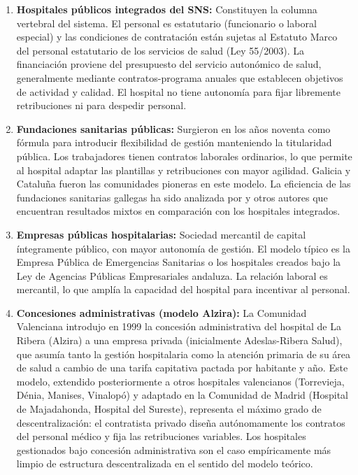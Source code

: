 \documentclass[12pt, a4paper, twoside, openright]{book}
\theoremstyle{plain}
\theoremstyle{definition}
\theoremstyle{remark}
\begin{document}
\begin{enumerate}[label=(\roman*)]
  \item \textbf{Hospitales públicos integrados del SNS:} Constituyen la columna vertebral del sistema. El personal es estatutario (funcionario o laboral especial) y las condiciones de contratación están sujetas al Estatuto Marco del personal estatutario de los servicios de salud (Ley 55/2003). La financiación proviene del presupuesto del servicio autonómico de salud, generalmente mediante contratos-programa anuales que establecen objetivos de actividad y calidad. El hospital no tiene autonomía para fijar libremente retribuciones ni para despedir personal.

  \item \textbf{Fundaciones sanitarias públicas:} Surgieron en los años noventa como fórmula para introducir flexibilidad de gestión manteniendo la titularidad pública. Los trabajadores tienen contratos laborales ordinarios, lo que permite al hospital adaptar las plantillas y retribuciones con mayor agilidad. Galicia y Cataluña fueron las comunidades pioneras en este modelo. La eficiencia de las fundaciones sanitarias gallegas ha sido analizada por \citet{prior2006} y otros autores que encuentran resultados mixtos en comparación con los hospitales integrados.

  \item \textbf{Empresas públicas hospitalarias:} Sociedad mercantil de capital íntegramente público, con mayor autonomía de gestión. El modelo típico es la Empresa Pública de Emergencias Sanitarias o los hospitales creados bajo la Ley de Agencias Públicas Empresariales andaluza. La relación laboral es mercantil, lo que amplía la capacidad del hospital para incentivar al personal.

  \item \textbf{Concesiones administrativas (modelo Alzira):} La Comunidad Valenciana introdujo en 1999 la concesión administrativa del hospital de La Ribera (Alzira) a una empresa privada (inicialmente Adeslas-Ribera Salud), que asumía tanto la gestión hospitalaria como la atención primaria de su área de salud a cambio de una tarifa capitativa pactada por habitante y año. Este modelo, extendido posteriormente a otros hospitales valencianos (Torrevieja, Dénia, Manises, Vinalopó) y adaptado en la Comunidad de Madrid (Hospital de Majadahonda, Hospital del Sureste), representa el máximo grado de descentralización: el contratista privado diseña autónomamente los contratos del personal médico y fija las retribuciones variables. Los hospitales gestionados bajo concesión administrativa son el caso empíricamente más limpio de estructura descentralizada en el sentido del modelo teórico.


\end{enumerate}
\end{document}
